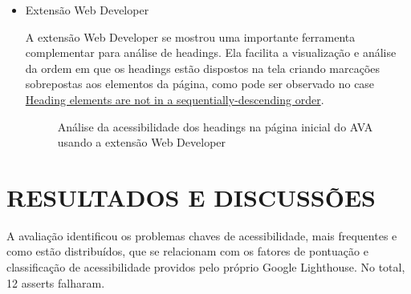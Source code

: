 \documentclass[
	12pt,				%
	openright,			%
	oneside,			%
	a4paper,			%
	chapter=TITLE,		%
	section=TITLE,		%
	subsection=TITLE,	%
	subsubsection=TITLE,%
	english,			%
	brazil				%
	]{abntex2}
\theoremstyle{definition}
\begin{document}
\begin{itemize}
\pagebreak

    \item Extensão Web Developer
    
A extensão Web Developer se mostrou uma importante ferramenta complementar para análise de headings. Ela facilita a visualização e análise da ordem em que os headings estão dispostos na tela criando marcações sobrepostas aos elementos da página, como pode ser observado no case  \hyperref[sec:heading]{Heading elements are not in a sequentially-descending order}.


\begin{figure}[!h]
\centering
\caption{Análise da acessibilidade dos headings na página inicial do AVA usando a extensão Web Developer}
\label{Análise da acessibilidade dos headings na página inicial do AVA usando a extensão Web Developer}
\end{figure}

\pagebreak


\end{itemize}

\chapter{RESULTADOS E DISCUSSÕES}

A avaliação identificou os problemas chaves de acessibilidade, mais frequentes e como estão distribuídos, que se relacionam com os fatores de pontuação e classificação de acessibilidade providos pelo próprio Google Lighthouse. No total, 12 asserts falharam.
\end{document}
